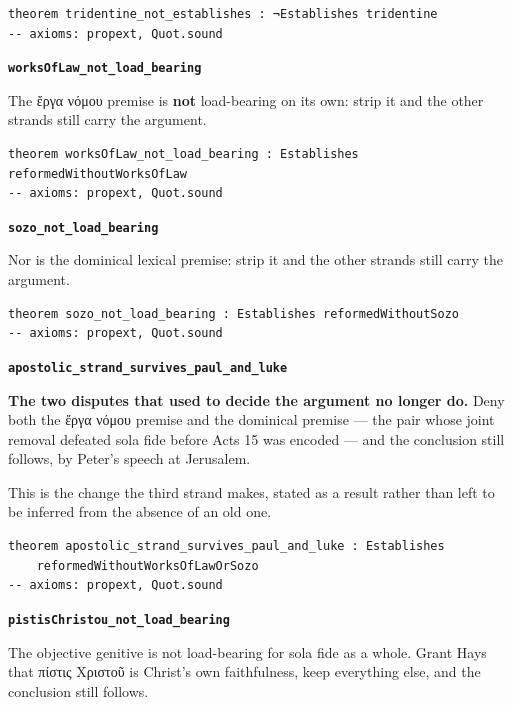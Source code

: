 \documentclass[11pt]{article}
\begin{document}
{\small\begin{verbatim}
theorem tridentine_not_establishes : ¬Establishes tridentine
-- axioms: propext, Quot.sound
\end{verbatim}}
\par\medskip\noindent\textbf{\texttt{works\allowbreak{}Of\allowbreak{}Law\_\allowbreak{}not\_\allowbreak{}load\_\allowbreak{}bearing}}\par\nobreak\noindent
The ἔργα νόμου premise is \textbf{not} load-bearing on its own: strip it and the other strands still carry the argument.

{\small\begin{verbatim}
theorem worksOfLaw_not_load_bearing : Establishes reformedWithoutWorksOfLaw
-- axioms: propext, Quot.sound
\end{verbatim}}
\par\medskip\noindent\textbf{\texttt{sozo\_\allowbreak{}not\_\allowbreak{}load\_\allowbreak{}bearing}}\par\nobreak\noindent
Nor is the dominical lexical premise: strip it and the other strands still carry the argument.

{\small\begin{verbatim}
theorem sozo_not_load_bearing : Establishes reformedWithoutSozo
-- axioms: propext, Quot.sound
\end{verbatim}}
\par\medskip\noindent\textbf{\texttt{apostolic\_\allowbreak{}strand\_\allowbreak{}survives\_\allowbreak{}paul\_\allowbreak{}and\_\allowbreak{}luke}}\par\nobreak\noindent
\textbf{The two disputes that used to decide the argument no longer do.} Deny both the ἔργα νόμου premise and the dominical premise — the pair whose joint removal defeated sola fide before Acts 15 was encoded — and the conclusion still follows, by Peter's speech at Jerusalem.

This is the change the third strand makes, stated as a result rather than left to be inferred from the absence of an old one.

{\small\begin{verbatim}
theorem apostolic_strand_survives_paul_and_luke : Establishes
    reformedWithoutWorksOfLawOrSozo
-- axioms: propext, Quot.sound
\end{verbatim}}
\par\medskip\noindent\textbf{\texttt{pistis\allowbreak{}Christou\_\allowbreak{}not\_\allowbreak{}load\_\allowbreak{}bearing}}\par\nobreak\noindent
The objective genitive is not load-bearing for sola fide as a whole. Grant Hays that πίστις Χριστοῦ is Christ's own faithfulness, keep everything else, and the conclusion still follows.
\end{document}
